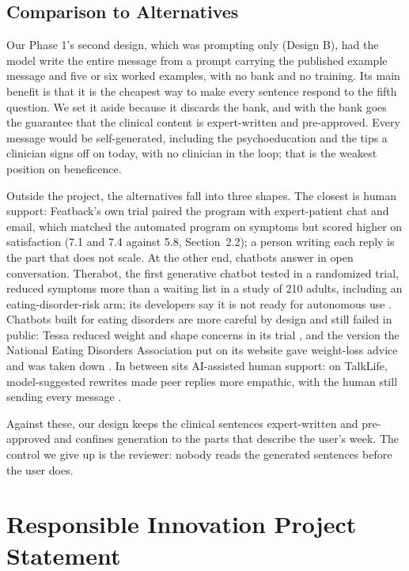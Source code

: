 \documentclass[a4paper]{article}
\begin{document}
\subsection{Comparison to Alternatives}

Our Phase 1's second design, which was prompting only (Design B), had the model write the entire message from a prompt carrying the published example message and five or six worked examples, with no bank and no training. Its main benefit is that it is the cheapest way to make every sentence respond to the fifth question. We set it aside because it discards the bank, and with the bank goes the guarantee that the clinical content is expert-written and pre-approved. Every message would be self-generated, including the psychoeducation and the tips a clinician signs off on today, with no clinician in the loop; that is the weakest position on beneficence.

Outside the project, the alternatives fall into three shapes. The closest is human support: Featback's own trial paired the program with expert-patient chat and email, which matched the automated program on symptoms but scored higher on satisfaction (7.1 and 7.4 against 5.8, Section~2.2); a person writing each reply is the part that does not scale. At the other end, chatbots answer in open conversation. Therabot, the first generative chatbot tested in a randomized trial, reduced symptoms more than a waiting list in a study of 210 adults, including an eating-disorder-risk arm; its developers say it is not ready for autonomous use \citep{heinz2025therabot}. Chatbots built for eating disorders are more careful by design and still failed in public: Tessa reduced weight and shape concerns in its trial \citep{fitzsimmonscraft2021tessa}, and the version the National Eating Disorders Association put on its website gave weight-loss advice and was taken down \citep{npr2023tessa}. In between sits AI-assisted human support: on TalkLife, model-suggested rewrites made peer replies more empathic, with the human still sending every message \citep{sharma2023humanai}.

Against these, our design keeps the clinical sentences expert-written and pre-approved and confines generation to the parts that describe the user's week. The control we give up is the reviewer: nobody reads the generated sentences before the user does.

\newpage

\section{Responsible Innovation Project Statement} 
\end{document}

